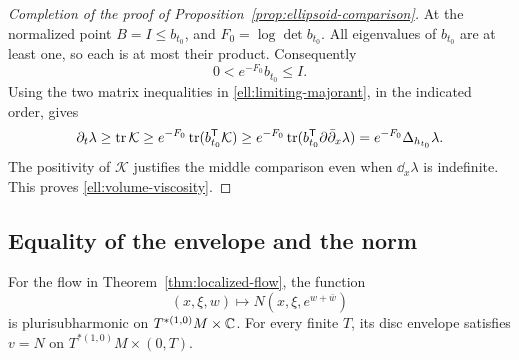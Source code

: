 \begin{proof}[Completion of the proof of Proposition~\ref{prop:ellipsoid-comparison}]
At the normalized point $B=I\le b_{t_0}$, and
$F_0=\log\det b_{t_0}$.  All eigenvalues of $b_{t_0}$ are at least
one, so each is at most their product.  Consequently
\[
 0<e^{-F_0}b_{t_0}\le I.
\]
Using the two matrix inequalities in
\eqref{ell:limiting-majorant}, in the indicated order, gives
\[
 \partial_t\lambda
 \ge\operatorname{tr}\mathcal K
 \ge e^{-F_0}\operatorname{tr}(b_{t_0}^{\mathsf T}\mathcal K)
 \ge e^{-F_0}\operatorname{tr}(b_{t_0}^{\mathsf T}\partial\bar\partial_x\lambda)
 =e^{-F_0}\Delta_{h_{t_0}}\lambda.
\]
The positivity of $\mathcal K$ justifies the middle comparison even
when $\dd_x\lambda$ is indefinite.  This proves
\eqref{ell:volume-viscosity}.
\end{proof}

\subsection{Equality of the envelope and the norm}

\begin{theorem}\label{thm:joint-positivity}
For the flow in Theorem~\ref{thm:localized-flow}, the function
\[
 (x,\xi,w)\longmapsto N(x,\xi,e^{w+\bar w})
\]
is plurisubharmonic on $T^{*(1,0)}M\times\mathbb C$.
For every finite $T$, its disc envelope satisfies $v=N$ on
$T^{*(1,0)}M\times(0,T)$.
\end{theorem}

